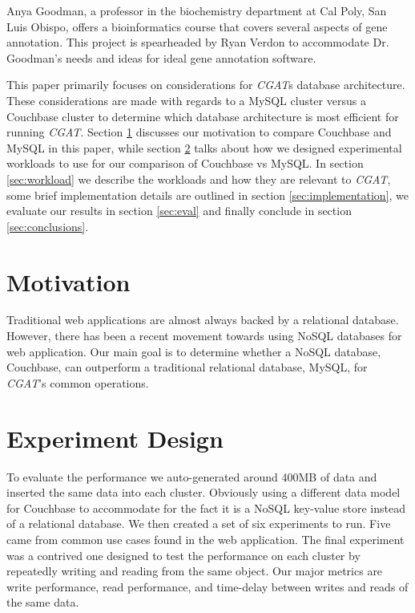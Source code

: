 \documentclass[10pt, conference, compsocconf]{IEEEtran}
\begin{document}
Anya Goodman, a professor in the biochemistry department at Cal Poly, San Luis
Obispo, offers a bioinformatics course that covers several aspects of gene
annotation. This project is spearheaded by Ryan Verdon to accommodate Dr.
Goodman's needs and ideas for ideal gene annotation software.

This paper primarily focuses on considerations for \textit{CGAT}s database
architecture. These considerations are made with regards to a MySQL cluster
versus a Couchbase cluster to determine which database architecture is most
efficient for running \textit{CGAT}. Section \ref{sec:motive} discusses our
motivation to compare Couchbase and MySQL in this paper, while section
\ref{sec:design} talks about how we designed experimental workloads to use for
our comparison of Couchbase vs MySQL. In section \ref{sec:workload} we
describe the workloads and how they are relevant to \textit{CGAT}, some brief
implementation details are outlined in section \ref{sec:implementation}, we
evaluate our results in section \ref{sec:eval} and finally conclude in
section \ref{sec:conclusions}.

\section{Motivation}\label{sec:motive}
Traditional web applications are almost always backed by a relational database.
However, there has been a recent movement towards using NoSQL databases for
web application. Our main goal is to determine whether a NoSQL database, Couchbase,
can outperform a traditional relational database, MySQL, for \textit{CGAT}'s
common operations.

\section{Experiment Design}\label{sec:design}
To evaluate the performance we auto-generated around
400MB of data and inserted the same data into each cluster. Obviously using a
different data model for Couchbase to accommodate for the fact it is a NoSQL
key-value store instead of a relational database. We then created a set of six
experiments to run. Five came from common use cases found in the web
application. The final experiment was a contrived one designed to test the performance on each
cluster by repeatedly writing and reading from the same object. Our major
metrics are write performance, read performance, and time-delay between writes
and reads of the same data.
\end{document}
